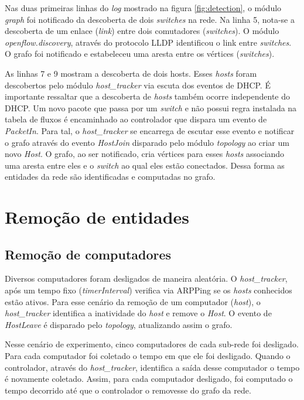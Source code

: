 Nas duas primeiras linhas do \emph{log} mostrado na figura
\ref{fig:detection}, o módulo \emph{graph} foi notificado
da descoberta de dois \emph{switches} na rede.
Na linha 5, nota-se a descoberta de um enlace (\emph{link}) entre dois
comutadores (\emph{switches}).
O módulo \emph{openflow.discovery}, através do protocolo LLDP identificou
o link entre \emph{switches}.
O grafo foi notificado e estabeleceu uma aresta entre os
vértices (\emph{switches}).

As linhas 7 e 9 mostram a descoberta de dois hosts.
Esses \emph{hosts} foram descobertos pelo módulo \emph{host\_tracker} via
escuta dos eventos de DHCP.
É importante ressaltar que a descoberta de \emph{hosts} também ocorre
independente do DHCP.
Um novo pacote que passa por um \emph{switch} e não possui regra
instalada na tabela de fluxos é encaminhado ao controlador que
dispara um evento de \emph{PacketIn}.
Para tal, o \emph{host\_tracker} se encarrega de escutar esse evento
e notificar o grafo através do evento \emph{HostJoin} disparado pelo módulo
\emph{topology} ao criar um novo \emph{Host}.
O grafo, ao ser notificado, cria vértices para esses \emph{hosts} associando
uma aresta entre eles e o \emph{switch} ao qual eles estão conectados.
Dessa forma as entidades da rede são identificadas e computadas no grafo.


\section{Remoção de entidades}

\subsection{Remoção de computadores}

Diversos computadores foram desligados de maneira aleatória.
O \emph{host\_tracker}, após um tempo fixo (\emph{timerInterval})
verifica via ARPPing se os \emph{hosts} conhecidos estão ativos.
Para esse cenário da remoção de um computador (\emph{host}),
o \emph{host\_tracker} identifica a inatividade do \emph{host} e remove o
\emph{Host}.
O evento de \emph{HostLeave} é disparado pelo \emph{topology},
atualizando assim o grafo.

Nesse cenário de experimento, cinco computadores de cada sub-rede foi desligado.
Para cada computador foi coletado o tempo em que ele foi desligado.
Quando o controlador, através do \emph{host\_tracker}, identifica a saída
desse computador o tempo é novamente coletado.
Assim, para cada computador desligado, foi computado o tempo decorrido até
que o controlador o removesse do grafo da rede.

